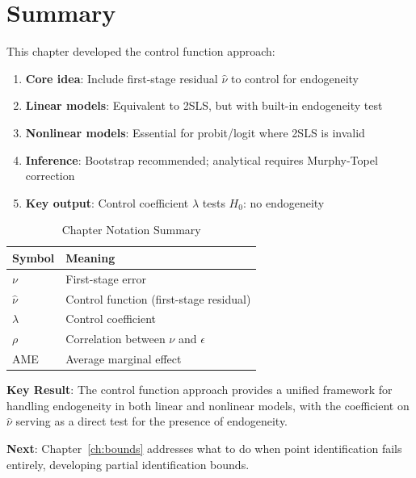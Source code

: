\section{Summary}
\label{sec:cf_summary}

This chapter developed the control function approach:

\begin{enumerate}
    \item \textbf{Core idea}: Include first-stage residual $\hat{\nu}$ to control for endogeneity

    \item \textbf{Linear models}: Equivalent to 2SLS, but with built-in endogeneity test

    \item \textbf{Nonlinear models}: Essential for probit/logit where 2SLS is invalid

    \item \textbf{Inference}: Bootstrap recommended; analytical requires Murphy-Topel correction

    \item \textbf{Key output}: Control coefficient $\lambda$ tests $H_0$: no endogeneity
\end{enumerate}

\begin{table}[htbp]
\centering
\caption{Chapter Notation Summary}
\label{tab:cf_notation}
\begin{tabular}{ll}
\toprule
Symbol & Meaning \\
\midrule
$\nu$ & First-stage error \\
$\hat{\nu}$ & Control function (first-stage residual) \\
$\lambda$ & Control coefficient \\
$\rho$ & Correlation between $\nu$ and $\epsilon$ \\
AME & Average marginal effect \\
\bottomrule
\end{tabular}
\end{table}

\textbf{Key Result}: The control function approach provides a unified framework for handling endogeneity in both linear and nonlinear models, with the coefficient on $\hat{\nu}$ serving as a direct test for the presence of endogeneity.

\textbf{Next}: Chapter~\ref{ch:bounds} addresses what to do when point identification fails entirely, developing partial identification bounds.
